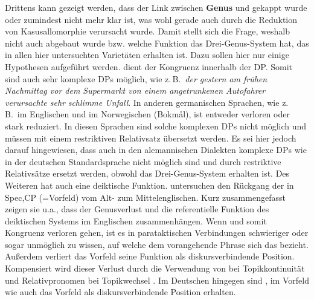 Drittens kann gezeigt werden, dass der Link zwischen \textbf{Genus} und  gekappt wurde oder zumindest nicht mehr klar ist, was wohl gerade auch durch die Reduktion von Kasusallomorphie verursacht wurde. Damit stellt sich die Frage, weshalb  nicht auch abgebaut wurde bzw. welche Funktion das Drei-Genus-System hat, das in allen hier untersuchten Varietäten erhalten ist. Dazu sollen hier nur einige Hypothesen aufgeführt werden.  dient der Kongruenz innerhalb der DP. Somit sind auch sehr komplexe DPs möglich, wie z.\,B.\ \textit{der gestern am frühen Nachmittag vor dem Supermarkt von einem angetrunkenen Autofahrer verursachte sehr} \textit{schlimme Unfall}. In anderen germanischen Sprachen, wie z.\,B.\ im Englischen und im Norwegischen (Bokmål), ist  entweder verloren oder stark reduziert. In diesen Sprachen sind solche komplexen DPs nicht möglich und müssen mit einem restriktiven Relativsatz übersetzt werden. Es sei hier jedoch darauf hingewiesen, dass auch in den alemannischen Dialekten komplexe DPs wie in der deutschen Standardsprache nicht möglich sind und durch restriktive Relativsätze ersetzt werden, obwohl das Drei-Genus-System erhalten ist. Des Weiteren hat  auch eine deiktische Funktion. \citet{LosvanKemenadeerscheint} untersuchen den Rückgang der  in Spec,CP (=Vorfeld) vom Alt- zum Mittelenglischen. Kurz zusammengefasst zeigen sie u.a., dass der Genusverlust und die referentielle Funktion des deiktischen Systems im Englischen zusammenhängen. Wenn  und somit Kongruenz verloren gehen, ist es in parataktischen Verbindungen schwieriger oder sogar unmöglich zu wissen, auf welche dem  vorangehende Phrase sich das  bezieht. Außerdem verliert das Vorfeld seine Funktion als diskursverbindende Position. Kompensiert wird dieser Verlust durch die Verwendung von  bei Topikkontinuität und Relativpronomen bei Topikwechsel \citep[13-17]{LosvanKemenadeerscheint}. Im Deutschen hingegen sind ,  im Vorfeld wie auch das Vorfeld als diskursverbindende Position erhalten.\\

